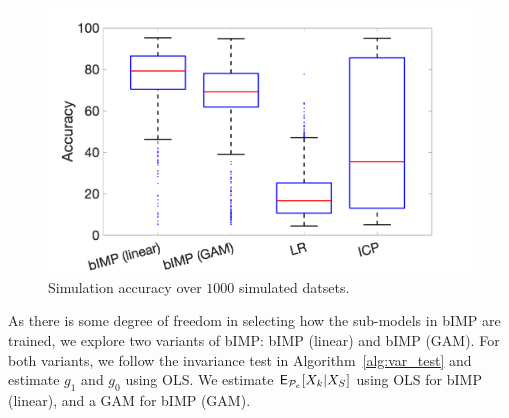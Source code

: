 \documentclass[conference,letterpaper]{IEEEtran}
\begin{document}
\begin{center}
\begin{figure}[h!]
\centering
\vspace{-1.5em}
  \includegraphics[width=0.85\linewidth]{sim_22.png}
  \caption{Simulation accuracy over $1000$ simulated datsets.}\label{fig:sim}
  \vspace{-2.5em}
\end{figure}
\end{center}

As there is some degree of freedom in selecting how the sub-models in \textsf{bIMP} are trained, we explore two variants of \textsf{bIMP}: \textsf{bIMP} (linear) and \textsf{bIMP} (GAM). For both variants, we follow the invariance test in Algorithm~\ref{alg:var_test} and estimate $g_1$ and $g_0$ using OLS. We estimate $\operatorname{\sf E}_{\mathcal{P}_e}[X_k|X_S]$ using OLS for \textsf{bIMP} (linear), and a GAM for \textsf{bIMP} (GAM).

\end{document}
